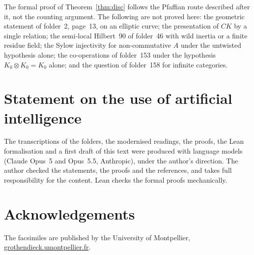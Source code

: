 \documentclass[11pt,a4paper]{amsart}
\theoremstyle{definition}
\theoremstyle{remark}
\begin{document}
The formal proof of Theorem~\ref{thm:disc} follows the Pfaffian route described after it, not the counting argument. The following are not proved here: the geometric statement of folder~2, page~13, on an elliptic curve; the presentation of $CK$ by a single relation; the semi-local Hilbert~90 of folder~46 with wild inertia or a finite residue field; the Sylow injectivity for non-commutative $A$ under the untwisted hypothesis alone; the co-operations of folder~153 under the hypothesis $K_0 \otimes K_0 = K_0$ alone; and the question of folder~158 for infinite categories.
\par\endgroup

\section*{Statement on the use of artificial intelligence}
The transcriptions of the folders, the modernised readings, the proofs, the Lean formalisation and a first draft of this text were produced with language models (Claude Opus~5 and Opus~5.5, Anthropic), under the author's direction. The author checked the statements, the proofs and the references, and takes full responsibility for the content. Lean checks the formal proofs mechanically.

\section*{Acknowledgements}
The facsimiles are published by the University of Montpellier, \href{https://grothendieck.umontpellier.fr/}{grothendieck.umontpellier.fr}.
\end{document}
